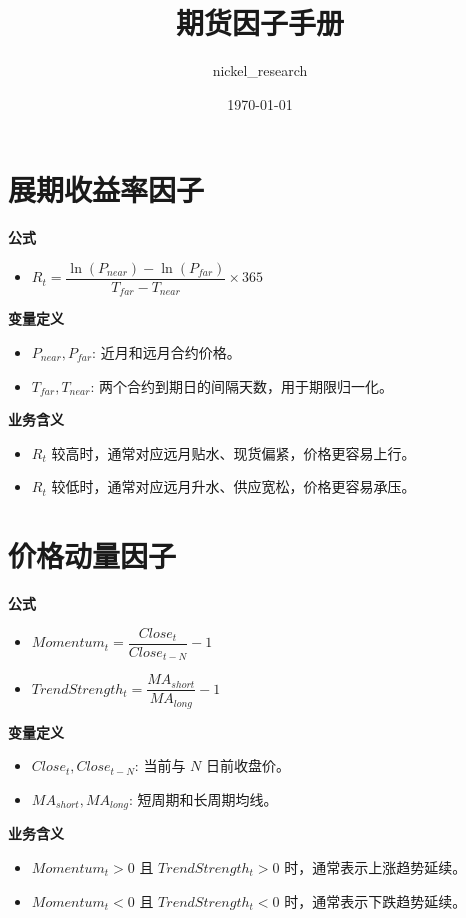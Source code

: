 \documentclass[11pt,a4paper]{ctexart}
\title{期货因子手册}
\author{nickel\_research}
\date{\today}
\begin{document}
        \maketitle
        \tableofcontents
        \newpage
        \section*{展期收益率因子}
\textbf{公式}
\begin{itemize}
\item $R_t=\dfrac{\ln(P_{near})-\ln(P_{far})}{T_{far}-T_{near}}\times 365$
\end{itemize}
\textbf{变量定义}
\begin{itemize}
\item $P_{near}, P_{far}$: 近月和远月合约价格。
\item $T_{far}, T_{near}$: 两个合约到期日的间隔天数，用于期限归一化。
\end{itemize}
\textbf{业务含义}
\begin{itemize}
\item $R_t$ 较高时，通常对应远月贴水、现货偏紧，价格更容易上行。
\item $R_t$ 较低时，通常对应远月升水、供应宽松，价格更容易承压。
\end{itemize}

\section*{价格动量因子}
\textbf{公式}
\begin{itemize}
\item $Momentum_t=\dfrac{Close_t}{Close_{t-N}}-1$
\item $TrendStrength_t=\dfrac{MA_{short}}{MA_{long}}-1$
\end{itemize}
\textbf{变量定义}
\begin{itemize}
\item $Close_t, Close_{t-N}$: 当前与 $N$ 日前收盘价。
\item $MA_{short}, MA_{long}$: 短周期和长周期均线。
\end{itemize}
\textbf{业务含义}
\begin{itemize}
\item $Momentum_t>0$ 且 $TrendStrength_t>0$ 时，通常表示上涨趋势延续。
\item $Momentum_t<0$ 且 $TrendStrength_t<0$ 时，通常表示下跌趋势延续。
\end{itemize}
\end{document}
